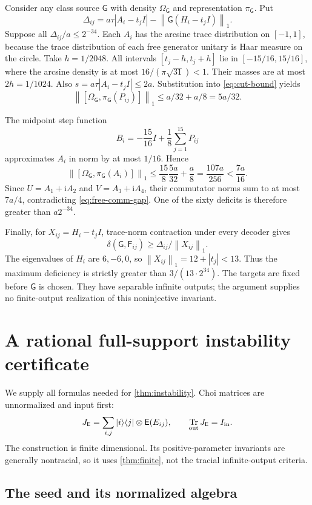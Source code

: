 \documentclass[11pt,reqno]{amsart}
\theoremstyle{definition}
\theoremstyle{remark}
\numberwithin{equation}{section}
\DeclareMathOperator{\Tr}{Tr}
\newcommand{\E}{\mathsf E}
\newcommand{\F}{\mathsf F}
\newcommand{\G}{\mathsf G}
\newcommand{\norm}[1]{\left\lVert#1\right\rVert}
\newcommand{\ii}{\mathrm i}
\newcommand{\defic}{\delta}
\begin{document}
Consider any class source $\G$ with density $\Omega_\G$ and representation $\pi_\G$. Put
\[
 \Delta_{ij}=a\tau|A_i-t_jI|-\norm{\G(H_i-t_jI)}_1.
\]
Suppose all $\Delta_{ij}/a\le2^{-34}$. Each $A_i$ has the arcsine trace distribution on $[-1,1]$, because the trace distribution of each free generator unitary is Haar measure on the circle. Take $h=1/2048$. All intervals $[t_j-h,t_j+h]$ lie in $[-15/16,15/16]$, where the arcsine density is at most $16/(\pi\sqrt{31})<1$. Their masses are at most $2h=1/1024$. Also $s=a\tau|A_i-t_jI|\le2a$. Substitution into \eqref{eq:cut-bound} yields
\[
 \norm{[\Omega_\G,\pi_\G(P_{ij})]}_1
 \le a/32+a/8=5a/32.
\]

The midpoint step function
\[
 B_i=-\frac{15}{16}I+\frac18\sum_{j=1}^{15}P_{ij}
\]
approximates $A_i$ in norm by at most $1/16$. Hence
\[
 \norm{[\Omega_\G,\pi_\G(A_i)]}_1
 \le\frac{15}{8}\frac{5a}{32}+\frac a8
 =\frac{107a}{256}<\frac{7a}{16}.
\]
Since $U=A_1+\ii A_2$ and $V=A_3+\ii A_4$, their commutator norms sum to at most $7a/4$, contradicting \eqref{eq:free-comm-gap}. One of the sixty deficits is therefore greater than $a2^{-34}$.

Finally, for $X_{ij}=H_i-t_jI$, trace-norm contraction under every decoder gives
\[
 \defic(\G,\F_{ij})\ge\Delta_{ij}/\norm{X_{ij}}_1.
\]
The eigenvalues of $H_i$ are $6,-6,0$, so $\norm{X_{ij}}_1=12+|t_j|<13$. Thus the maximum deficiency is strictly greater than $3/(13\cdot2^{34})$. The targets are fixed before $\G$ is chosen. They have separable infinite outputs; the argument supplies no finite-output realization of this noninjective invariant.



\section{A rational full-support instability certificate}\label{app:instability}

We supply all formulas needed for \cref{thm:instability}. Choi matrices are unnormalized and input first:
\[
 J_\E=\sum_{i,j}|i\rangle\langle j|\otimes\E(E_{ij}),\qquad
 \Tr_{\rm out}J_\E=I_{\rm in}.
\]
The construction is finite dimensional. Its positive-parameter invariants are generally nontracial, so it uses \cref{thm:finite}, not the tracial infinite-output criteria.

\subsection{The seed and its normalized algebra}
\end{document}
